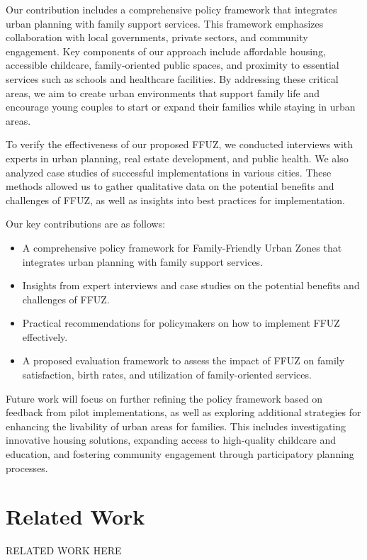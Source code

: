 \documentclass{article} %
\begin{document}
Our contribution includes a comprehensive policy framework that integrates urban planning with family support services. This framework emphasizes collaboration with local governments, private sectors, and community engagement. Key components of our approach include affordable housing, accessible childcare, family-oriented public spaces, and proximity to essential services such as schools and healthcare facilities. By addressing these critical areas, we aim to create urban environments that support family life and encourage young couples to start or expand their families while staying in urban areas.

To verify the effectiveness of our proposed FFUZ, we conducted interviews with experts in urban planning, real estate development, and public health. We also analyzed case studies of successful implementations in various cities. These methods allowed us to gather qualitative data on the potential benefits and challenges of FFUZ, as well as insights into best practices for implementation.

Our key contributions are as follows:
\begin{itemize}
    \item A comprehensive policy framework for Family-Friendly Urban Zones that integrates urban planning with family support services.
    \item Insights from expert interviews and case studies on the potential benefits and challenges of FFUZ.
    \item Practical recommendations for policymakers on how to implement FFUZ effectively.
    \item A proposed evaluation framework to assess the impact of FFUZ on family satisfaction, birth rates, and utilization of family-oriented services.
\end{itemize}

Future work will focus on further refining the policy framework based on feedback from pilot implementations, as well as exploring additional strategies for enhancing the livability of urban areas for families. This includes investigating innovative housing solutions, expanding access to high-quality childcare and education, and fostering community engagement through participatory planning processes.

\section{Related Work}
\label{sec:related}
RELATED WORK HERE
\end{document}
